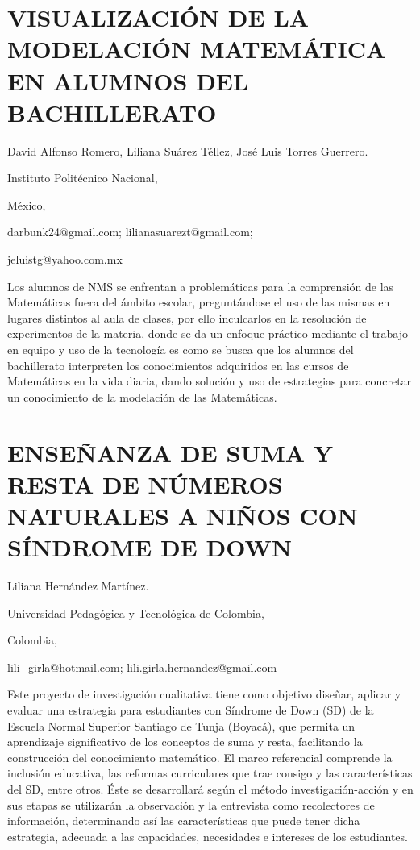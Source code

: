 \section{VISUALIZACIÓN DE LA MODELACIÓN MATEMÁTICA EN ALUMNOS DEL BACHILLERATO}

\begin{datos}

David Alfonso Romero, Liliana Suárez Téllez, José Luis Torres Guerrero.

Instituto Politécnico Nacional, 

México,

darbunk24@gmail.com; lilianasuarezt@gmail.com;

jeluistg@yahoo.com.mx

\end{datos}

Los alumnos de NMS se enfrentan a problemáticas para la comprensión
de las Matemáticas fuera del ámbito escolar, preguntándose el uso
de las mismas en lugares distintos al aula de clases, por ello inculcarlos
en la resolución de experimentos de la materia, donde se da un enfoque
práctico mediante el trabajo en equipo y uso de la tecnología es como
se busca que los alumnos del bachillerato interpreten los conocimientos
adquiridos en las cursos de Matemáticas en la vida diaria, dando solución
y uso de estrategias para concretar un conocimiento de la modelación
de las Matemáticas.


\section{ENSEÑANZA DE SUMA Y RESTA DE NÚMEROS NATURALES A NIÑOS CON SÍNDROME
DE DOWN }

\begin{datos}

Liliana Hernández Martínez.

Universidad Pedagógica y Tecnológica de Colombia, 

Colombia,

lili\_girla@hotmail.com; lili.girla.hernandez@gmail.com 

\end{datos}

Este proyecto de investigación cualitativa tiene como objetivo diseñar,
aplicar y evaluar una estrategia para estudiantes con Síndrome de
Down (SD) de la Escuela Normal Superior Santiago de Tunja (Boyacá),
que permita un aprendizaje significativo de los conceptos de suma
y resta, facilitando la construcción del conocimiento matemático.
El marco referencial comprende la inclusión educativa, las reformas
curriculares que trae consigo y las características del SD, entre
otros. Éste se desarrollará según el método investigación-acción y
en sus etapas se utilizarán la observación y la entrevista como recolectores
de información, determinando así las características que puede tener
dicha estrategia, adecuada a las capacidades, necesidades e intereses
de los estudiantes.


